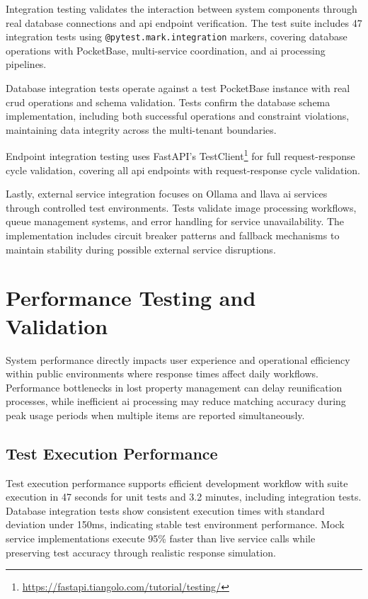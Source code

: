 Integration testing validates the interaction between system components through real database connections and \ac{api} endpoint verification. The test suite includes 47 integration tests using \texttt{@pytest.mark.integration} markers, covering database operations with PocketBase, multi-service coordination, and \ac{ai} processing pipelines.

Database integration tests operate against a test PocketBase instance with real \ac{crud} operations and schema validation. Tests confirm the database schema implementation, including both successful operations and constraint violations, maintaining data integrity across the multi-tenant boundaries.

Endpoint integration testing uses FastAPI's TestClient\footnote{\url{https://fastapi.tiangolo.com/tutorial/testing/}} for full request-response cycle validation, covering all \ac{api} endpoints with request-response cycle validation.

Lastly, external service integration focuses on Ollama and \ac{llava} \ac{ai} services through controlled test environments. Tests validate image processing workflows, queue management systems, and error handling for service unavailability. The implementation includes circuit breaker patterns and fallback mechanisms to maintain stability during possible external service disruptions.


\section{Performance Testing and Validation} \label{section:performance_testing}

System performance directly impacts user experience and operational efficiency within public environments where response times affect daily workflows. Performance bottlenecks in lost property management can delay reunification processes, while inefficient \ac{ai} processing may reduce matching accuracy during peak usage periods when multiple items are reported simultaneously.

\subsection{Test Execution Performance} \label{subsection:test_execution_performance}

Test execution performance supports efficient development workflow with suite execution in 47 seconds for unit tests and 3.2 minutes, including integration tests. Database integration tests show consistent execution times with standard deviation under 150ms, indicating stable test environment performance. Mock service implementations execute 95\% faster than live service calls while preserving test accuracy through realistic response simulation.

